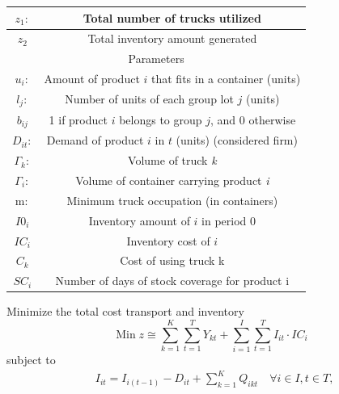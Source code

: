 \begin{ChapterAppendix}
\begin{table}
\begin{tabular}{|c|c|}
    \hline$z_1:$          & Total number of trucks utilized                                                       \\
    \hline$z_2$           & Total inventory amount generated                                                      \\
    \hline \multicolumn{2}{|c|}{ Parameters }                                                                     \\
    \hline$u_i:$          & Amount of product $i$ that fits in a container (units)                                \\
    \hline$l_j:$          & Number of units of each group lot $j$ (units)                                         \\
    \hline$b_{i j}$       & 1 if product $i$ belongs to group $j$, and 0 otherwise                                \\
    \hline$D_{i t}:$      & Demand of product $i$ in $t$ (units) (considered firm)                                \\
    \hline$\Gamma_k:$     & Volume of truck \textit{k}                                                            \\
    \hline$\Gamma_i:$     & Volume of container carrying product \textit{i}                                       \\
    \hline $\mathrm{m}:$  & Minimum truck occupation (in containers)                                              \\
    \hline $I0_i$         & Inventory amount of $i$ in period 0                                                   \\
    \hline $IC_i$         & Inventory cost of $i$                                                                 \\
    \hline $C_k$          & Cost of using truck k                                                                 \\
    \hline $SC_i$         & Number of days of stock coverage for product i
    \\
    \hline
  \end{tabular}
\end{table}
\FloatBarrier
Minimize the total cost transport and inventory
$$
  \operatorname{Min} z \cong \sum_{k=1}^K \sum_{t=1}^T Y_{k t} + \sum_{i=1}^I \sum_{t=1}^T I_{i t}\cdot IC_i
$$
subject to
$$
  \begin{aligned}
     & I_{i t}=I_{i(t-1)}-D_{i t}+\sum_{k=1}^K Q_{i k t} \quad \forall i\in I, t \in  T,                                                               \\

\end{aligned}$$
\end{ChapterAppendix}
